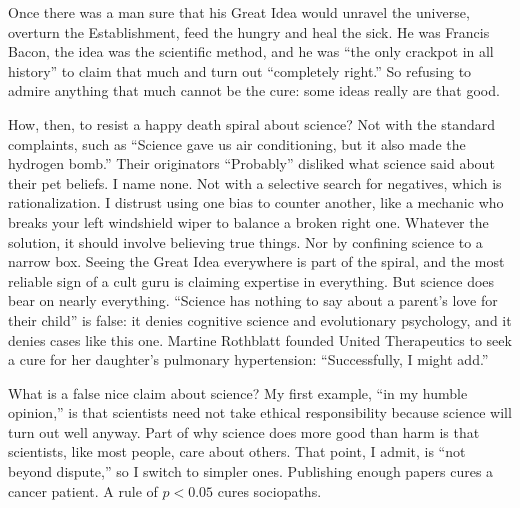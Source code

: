 
Once there was a man sure that his Great Idea would unravel the universe, overturn the Establishment, feed the hungry and heal the sick. He was Francis Bacon, the idea was the scientific method, and he was ``the only crackpot in all history'' to claim that much and turn out ``completely right.'' So refusing to admire anything that much cannot be the cure: some ideas really are that good.

How, then, to resist a happy death spiral about science? Not with the standard complaints, such as ``Science gave us air conditioning, but it also made the hydrogen bomb.'' Their originators ``Probably'' disliked what science said about their pet beliefs. I name none.  Not with a selective search for negatives, which is rationalization. I distrust using one bias to counter another, like a mechanic who breaks your left windshield wiper to balance a broken right one. Whatever the solution, it should involve believing true things. Nor by confining science to a narrow box. Seeing the Great Idea everywhere is part of the spiral, and the most reliable sign of a cult guru is claiming expertise in everything. But science does bear on nearly everything. ``Science has nothing to say about a parent's love for their child'' is false: it denies cognitive science and evolutionary psychology, and it denies cases like this one. Martine Rothblatt founded United Therapeutics to seek a cure for her daughter's pulmonary hypertension: ``Successfully, I might add.'' 

What is a false nice claim about science? My first example, ``in my humble opinion,'' is that scientists need not take ethical responsibility because science will turn out well anyway. Part of why science does more good than harm is that scientists, like most people, care about others. That point, I admit, is ``not beyond dispute,'' so I switch to simpler ones. Publishing enough papers cures a cancer patient. A rule of $p < 0.05$ cures sociopaths. 


